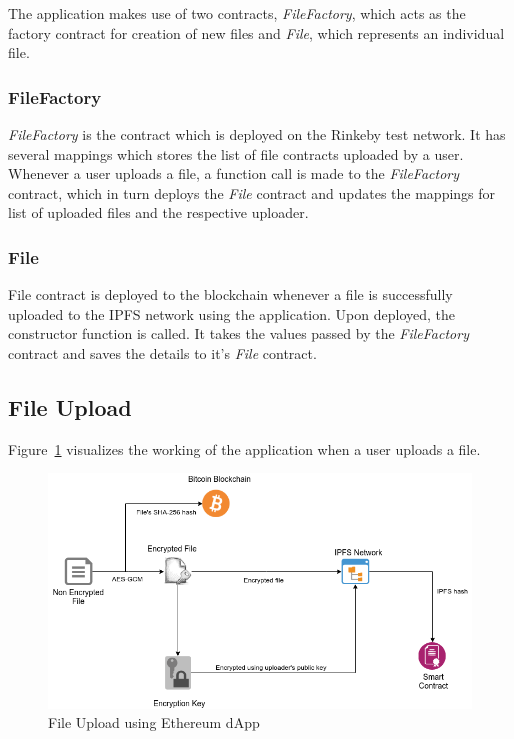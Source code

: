 The application makes use of two contracts, \textit{FileFactory}, which acts as the factory contract for creation of new files and \textit{File}, which represents an individual file.

\subsubsection{FileFactory}
\textit{FileFactory} is the contract which is deployed on the Rinkeby test network. It has several mappings which stores the list of file contracts uploaded by a user. Whenever a user uploads a file, a function call is made to the \textit{FileFactory} contract, which in turn deploys the \textit{File} contract and updates the mappings for list of uploaded files and the respective uploader.

\subsubsection{File}
File contract is deployed to the blockchain whenever a file is successfully uploaded to the IPFS network using the application. Upon deployed, the constructor function is called. It takes the values passed by the \textit{FileFactory} contract and saves the details to it’s \textit{File} contract.

\subsection{File Upload}
Figure~\ref{fig:ethereum-upload} visualizes the working of the application when a user uploads a file.

\begin{figure}[h]
	\includegraphics[width=\linewidth]{figures/ethereum-upload}
	\caption{\label{fig:ethereum-upload} File Upload using Ethereum dApp}
\end{figure}

